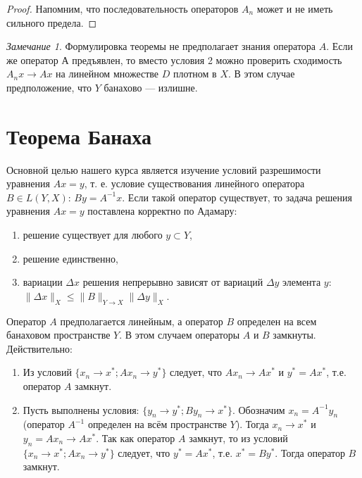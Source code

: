 \documentclass[12pt,a4paper,titlepage]{book}
\theoremstyle{definition}
\theoremstyle{plain}
\theoremstyle{remark}
\newtheorem*{remark}{Замечание}
\theoremstyle{remark}
\theoremstyle{remark}
\theoremstyle{plain}
\begin{document}
\begin{proof}
Напомним, что последовательность операторов $A_n$ может и не иметь сильного предела.
\end{proof}

\begin{remark}
Формулировка теоремы не предполагает знания оператора $A$. Если же оператор $А$ предъявлен, то вместо условия 2 можно проверить сходимость $A_n x\to A x$ на линейном множестве $D$ плотном в $X$. В этом случае предположение, что $Y$ банахово --- излишне.
\end{remark}

\section{Теорема Банаха}
Основной целью нашего курса является изучение условий разрешимости уравнения $Ax=y$, т. е. условие существования $\underbar {линейного}$ оператора $B\in L(Y, X)$: $By=A^{-1}x$. Если такой оператор существует, то задача решения уравнения $Ax=y$ поставлена корректно по Адамару:
\begin{enumerate}
	\item решение существует для любого $y \subset Y$,
	\item решение единственно,
	\item вариации $\Delta x$ решения непрерывно зависят от вариаций $\Delta y$ элемента $y$: $\lVert \Delta x\rVert_X \leq \lVert B\rVert_{Y\rightarrow X}\lVert \Delta y\rVert_X$.
\end{enumerate}
Оператор $A$ предполагается линейным, а оператор $B$ определен на всем банаховом пространстве $Y$. В этом случаем операторы $A$ и $B$ замкнуты. Действительно:
\begin{enumerate}

	\item Из условий $\{x_n \rightarrow x^{*};Ax_n \rightarrow y^{*}\}$ следует, что $Ax_n \rightarrow Ax^{*}$ и $y^{*}=Ax^{*}$, т.е. оператор $A$ замкнут.

	\item Пусть выполнены условия: $\{y_n \rightarrow y^{*}; By_n \rightarrow x^{*}\}$. Обозначим $x_n=A^{-1}y_n$ (оператор $A^{-1}$ определен на всём пространстве $Y$). Тогда $x_n \rightarrow x^{*}$ и $y_n=Ax_n \rightarrow Ax^{*}$. Так как оператор $A$ замкнут, то из условий $\{x_n \rightarrow x^{*};Ax_n \rightarrow y^{*}\}$ следует, что $y^{*}=Ax^{*}$, т.е. $x^{*}=By^{*}$. Тогда оператор $B$ замкнут.
	
\end{enumerate}
	
\end{document}
